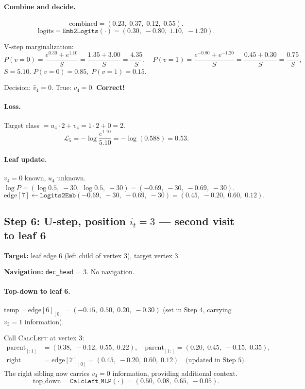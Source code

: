 \documentclass[11pt,a4paper]{article}
\newcommand{\calL}{\textsc{CalcLeft}}
\begin{document}
\paragraph{Combine and decide.}
\[
\text{combined} = (0.23,\; 0.37,\; 0.12,\; 0.55).
\]
\[
\text{logits} = \texttt{Emb2Logits}(\cdot) = (0.30,\; -0.80,\; 1.10,\; -1.20).
\]

V-step marginalization:
\[
P(v{=}0) = \frac{e^{0.30} + e^{1.10}}{S} = \frac{1.35 + 3.00}{S} = \frac{4.35}{S}, \quad
P(v{=}1) = \frac{e^{-0.80} + e^{-1.20}}{S} = \frac{0.45 + 0.30}{S} = \frac{0.75}{S},
\]
$S = 5.10$.  $P(v{=}0) = 0.85,\; P(v{=}1) = 0.15$.

Decision: $\hat{v}_4 = 0$.  True: $v_4 = 0$.  \textbf{Correct!}

\paragraph{Loss.}
Target class $= u_4 \cdot 2 + v_4 = 1 \cdot 2 + 0 = 2$.
\[
\mathcal{L}_5 = -\log \frac{e^{1.10}}{5.10} = -\log(0.588) = 0.53.
\]

\paragraph{Leaf update.}
$v_4 = 0$ known, $u_4$ unknown.  $\log P = (\log 0.5,\; -30,\; \log 0.5,\; -30) = (-0.69,\; -30,\; -0.69,\; -30)$.
\[
\text{edge}[7] \leftarrow \texttt{Logits2Emb}(-0.69,\; -30,\; -0.69,\; -30) = (0.45,\; -0.20,\; 0.60,\; 0.12).
\]

\subsection{Step 6: U-step, position $i_t = 3$ --- second visit to leaf 6}

\textbf{Target:} leaf edge 6 (left child of vertex 3), target vertex 3.

\textbf{Navigation:} \texttt{dec\_head} = 3.  No navigation.

\paragraph{Top-down to leaf 6.}
$\text{temp} = \text{edge}[6]_{[0]} = (-0.15,\; 0.50,\; 0.20,\; -0.30)$ (set in Step 4, carrying $v_3 = 1$ information).

Call \calL{} at vertex 3:
\begin{align*}
\text{parent}_{[:1]} &= (0.38,\; -0.12,\; 0.55,\; 0.22), \quad
\text{parent}_{[1:]} = (0.20,\; 0.45,\; -0.15,\; 0.35), \\
\text{right} &= \text{edge}[7]_{[0]} = (0.45,\; -0.20,\; 0.60,\; 0.12) \quad \text{(updated in Step 5)}.
\end{align*}
The right sibling now carries $v_4 = 0$ information, providing additional context.
\[
\text{top\_down} = \texttt{CalcLeft\_MLP}(\cdot) = (0.50,\; 0.08,\; 0.65,\; -0.05).
\]
\end{document}
